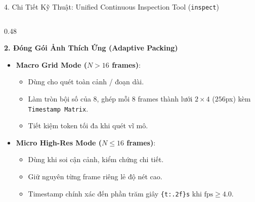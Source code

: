 \documentclass[aspectratio=169, 10pt]{beamer}
\begin{document}
\begin{frame}{4. Chi Tiết Kỹ Thuật: Unified Continuous Inspection Tool (\texttt{inspect})}
\begin{columns}[T]
        \begin{column}{0.48\textwidth}
            \begin{block}{\textbf{2. Đóng Gói Ảnh Thích Ứng (Adaptive Packing)}}
                \begin{itemize}
                    \item \textbf{Macro Grid Mode ($N > 16$ frames)}:
                    \begin{itemize}\footnotesize
                        \item Dùng cho quét toàn cảnh / đoạn dài.
                        \item Làm tròn bội số của 8, ghép mỗi 8 frames thành lưới $2\times 4$ ($256$px) kèm \texttt{Timestamp Matrix}.
                        \item Tiết kiệm token tối đa khi quét vĩ mô.
                    \end{itemize}
                    \item \textbf{Micro High-Res Mode ($N \le 16$ frames)}:
                    \begin{itemize}\footnotesize
                        \item Dùng khi soi cận cảnh, kiểm chứng chi tiết.
                        \item Giữ nguyên từng frame riêng lẻ độ nét cao.
                        \item Timestamp chính xác đến phần trăm giây \texttt{\{t:.2f\}s} khi $\text{fps} \ge 4.0$.
                    \end{itemize}
                \end{itemize}
            \end{block}
        \end{column}
    \end{columns}
\end{frame}
\end{document}
